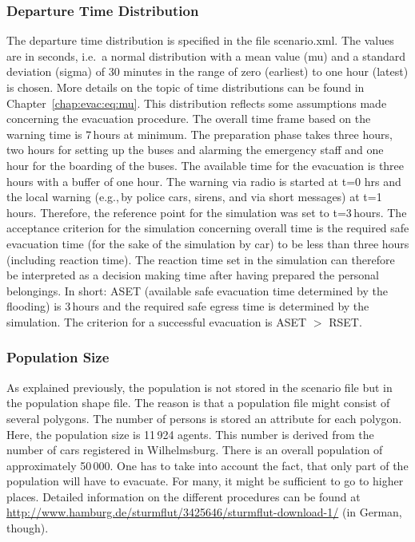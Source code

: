 \subsubsection{Departure Time Distribution}
The departure time distribution is specified in the file scenario.xml. The values are in seconds, i.e.\ a normal distribution with a mean value (mu) and a standard deviation (sigma) of 30 minutes in the range of zero (earliest) to one hour (latest) is chosen. 
More details on the topic of time distributions can be found in Chapter~\ref{chap:evac:eq:mu}. This distribution reflects some assumptions made concerning the evacuation procedure. The overall time frame based on the warning time is 7\,hours at minimum. The preparation phase takes three hours, two hours for setting up the buses and alarming the emergency staff and one hour for the boarding of the buses. The available time for the evacuation is three hours with a buffer of one hour. 
The warning via radio is started at t=0 hrs and the local warning (e.g.,\,by police cars, sirens, and via short messages) at t=1\,hours. Therefore, the reference point for the simulation was set to t=3\,hours. The acceptance criterion for the simulation concerning overall time is the required safe evacuation time (for the sake of the simulation by car) to be less than three hours (including reaction time). The reaction time set in the simulation can therefore be interpreted as a decision making time after having prepared the personal belongings. In short: ASET (available safe evacuation time determined by the flooding) is 3\,hours and the required safe egress time is determined by the simulation. The criterion for a successful evacuation is ASET $>$ RSET.

\subsubsection{Population Size}
As explained previously, the population is not stored in the scenario file but in the population shape file. The reason is that a population file might consist of several polygons. The number of persons is stored an attribute for each polygon. Here, the population size is 11\,924 agents. This number is derived from the number of cars registered in Wilhelmsburg. There is an overall population of approximately 50\,000. One has to take into account the fact, that only part of the population will have to evacuate. For many, it might be sufficient to go to higher places. Detailed information on the different procedures can be found at \url{http://www.hamburg.de/sturmflut/3425646/sturmflut-download-1/} (in German, though).

